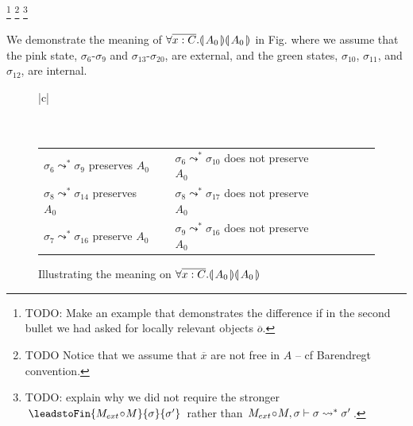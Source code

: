   
\footnote{{TODO: Make an example that demonstrates the difference if in the second bullet we had asked for locally relevant objects ${\overline o}$.}}
\footnote{{TODO Notice that we assume that $\overline x$ are not free in $A$ -- cf Barendregt convention.}}
\footnote{TODO: explain why we did not require the stronger $\leadstoFin{M_{ext}\!\circ \!M}{\sigma}{\sigma'}$ rather than $M_{ext}\!\circ \!M, \sigma \vdash {\sigma} \leadsto^* \sigma'$.}



{We demonstrate the meaning of ${\forall {\overline {x:C}}.{\llparenthesis}\, A_0 \,{\rrparenthesis}{\llparenthesis}\, A_0 \,{\rrparenthesis}}$ in Fig. where we assume that the pink state, \ie   ${\sigma_6}$-${\sigma_9}$ and $\sigma_{13}$-$\sigma_{20}$, are external, and the green states, \ie   ${\sigma_{10}}$, 
 ${\sigma_{11}}$,  and ${\sigma_{12}}$, are internal.}
 
 \begin{figure}[htb]
\begin{tabular}{|c|}
\hline \\
\\
\hline
\\
\begin{tabular}{lclclcl} 
$ {\sigma_6} \leadsto^*  \sigma_9 $ preserves $A_0$ & &
$ {\sigma_6} \leadsto^*  \sigma_{10} $ does not preserve $A_0$ \\
$ {\sigma_8} \leadsto^*  \sigma_{14} $ preserves $A_0$ & &
$ {\sigma_8} \leadsto^* \sigma_{17} $ does not preserve $A_0$\\
$ {\sigma_7} \leadsto^*  \sigma_{16} $  preserve $A_0$ & &
$ {\sigma_9} \leadsto^*  \sigma_{16} $ does not preserve $A_0$
\\
\hline
\end{tabular}
\end{tabular}
   \caption{Illustrating  the meaning on ${\forall {\overline {x:C}}.{\llparenthesis}\, A_0 \,{\rrparenthesis}{\llparenthesis}\, A_0 \,{\rrparenthesis}}$    }
   \label{fig:TwoStateSemantics}
 \end{figure}
 

